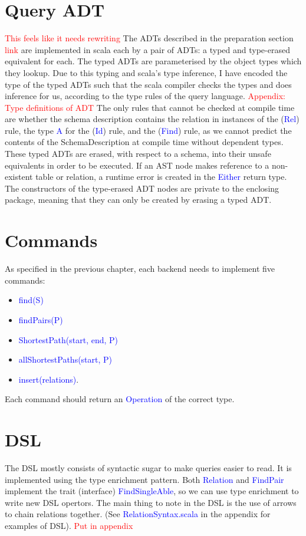 \documentclass[12pt,a4paper,twoside,openright]{report}
\newcommand\todo[1]{\textcolor{red}{#1}}
\newcommand\codeName[1]{\textcolor{blue}{#1}}
\begin{document}
\section{Query ADT}
	\todo{This feels like it needs rewriting}
The ADTs described in the preparation section \todo{link}	are implemented in scala each by a pair of ADTs: a typed and type-erased equivalent for each. The typed ADTs are parameterised by the object types which they lookup. Due to this typing and scala’s type inference, I have encoded the type of the typed ADTs such that the scala compiler checks the types and does inference for us, according to the type rules of the query language. \todo{Appendix: Type definitions of ADT} The only rules that cannot be checked at compile time are whether the schema description contains the relation in instances of the (\codeName{Rel}) rule, the type \codeName{A} for the (\codeName{Id}) rule, and the (\codeName{Find}) rule, as we cannot predict the contents of the SchemaDescription at compile time without dependent types.  These typed ADTs are erased,  with respect to a schema,  into their unsafe equivalents in order to be executed. If an AST node makes reference to a non-existent table or relation, a runtime error is created in the \codeName{Either} return type. The constructors of the type-erased ADT nodes are private to the enclosing package, meaning that they can only be created by erasing a typed ADT.
	
\section{Commands}
As specified in the previous chapter, each backend needs to implement five commands: 
\begin{itemize}
\item \codeName{find(S)}
\item \codeName{findPairs(P)}
\item \codeName{ShortestPath(start, end, P)}
\item \codeName{allShortestPaths(start, P)}
\item \codeName{insert(relations)}.
\end{itemize}
Each command should return an \codeName{Operation} of the correct type.
\section{DSL}
The DSL mostly consists of syntactic sugar to make queries easier to read. It is implemented using the type enrichment pattern. Both \codeName{Relation} and \codeName{FindPair} implement the trait (interface) \codeName{FindSingleAble}, so we can use type enrichment to write new DSL opertors. The main thing to note in the DSL is the use of arrows to chain relations together. (See \codeName{RelationSyntax.scala} in the appendix for examples of DSL). \todo{Put in appendix}
\end{document}
